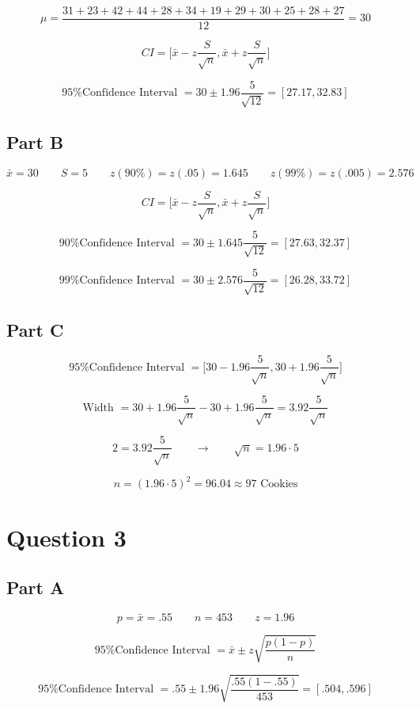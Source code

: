 \documentclass[letterpaper]{article}
\begin{document}
$$\mu = \frac{31 + 23 + 42 + 44 + 28 + 34 + 19 + 29 + 30 + 25 + 28 + 27}{12} = 30$$

$$CI = \Big[ \bar{x} - z \frac{S}{\sqrt{n}}, \bar{x} + z \frac{S}{\sqrt{n}}\Big]$$

$$\text{95\% Confidence Interval } = 30 \pm 1.96 \frac{5}{\sqrt{12}} = [27.17, 32.83]$$

\subsection*{Part B}

$$\bar{x} = 30 \qquad S = 5 \qquad z(90\%) = z(.05) = 1.645 \qquad z(99\%) = z(.005) = 2.576$$

$$CI = \Big[ \bar{x} - z \frac{S}{\sqrt{n}}, \bar{x} + z \frac{S}{\sqrt{n}}\Big]$$

$$\text{90\% Confidence Interval } = 30 \pm 1.645 \frac{5}{\sqrt{12}} = [27.63, 32.37]$$

$$\text{99\% Confidence Interval } = 30 \pm 2.576 \frac{5}{\sqrt{12}} = [26.28, 33.72]$$

\subsection*{Part C}

$$\text{95\% Confidence Interval } = \Big[ 30 - 1.96 \frac{5}{\sqrt{n}}, 30 + 1.96 \frac{5}{\sqrt{n}} \Big]$$

$$\text{Width } = 30 + 1.96 \frac{5}{\sqrt{n}} - 30 + 1.96 \frac{5}{\sqrt{n}} = 3.92 \frac{5}{\sqrt{n}}$$

$$2 = 3.92 \frac{5}{\sqrt{n}} \qquad \longrightarrow \qquad \sqrt{n} = 1.96 \cdot 5$$

$$n = (1.96 \cdot 5)^2 = 96.04 \approx 97 \text{ Cookies}$$

\newpage

\section*{Question 3}

\subsection*{Part A}

$$p = \bar{x} = .55 \qquad n = 453 \qquad z = 1.96$$

$$\text{95\% Confidence Interval } = \bar{x} \pm z \sqrt{\frac{p(1-p)}{n}}$$

$$\text{95\% Confidence Interval } = .55 \pm 1.96 \sqrt{\frac{.55(1-.55)}{453}} = [.504, .596]$$
\end{document}
